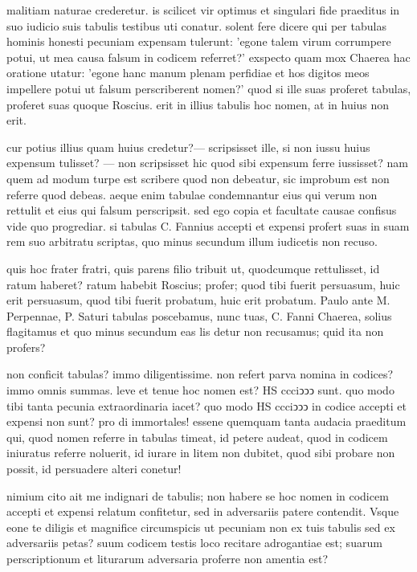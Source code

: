 
 malitiam naturae crederetur. is scilicet vir optimus et singulari fide praeditus in suo iudicio suis tabulis testibus uti conatur. solent fere dicere qui per tabulas hominis honesti pecuniam expensam tulerunt: 'egone talem virum corrumpere potui, ut mea causa falsum in codicem referret?' exspecto quam mox Chaerea hac oratione utatur: 'egone hanc manum plenam perfidiae et hos digitos meos impellere potui ut falsum perscriberent nomen?' quod si ille suas proferet tabulas, proferet suas quoque Roscius. erit in illius tabulis hoc nomen, at in huius non erit.

 cur potius illius quam huius credetur?— scripsisset ille, si non iussu huius expensum tulisset? — non scripsisset hic quod sibi expensum ferre iussisset? nam quem ad modum turpe est scribere quod non debeatur, sic improbum est non referre quod debeas. aeque enim tabulae condemnantur eius qui verum non rettulit et eius qui falsum perscripsit. sed ego copia et facultate causae confisus vide quo progrediar. si tabulas C. Fannius accepti et expensi profert suas in suam rem suo arbitratu scriptas, quo minus secundum illum iudicetis non recuso.

 quis hoc frater fratri, quis parens filio tribuit ut, quodcumque rettulisset, id ratum haberet? ratum habebit Roscius; profer; quod tibi fuerit persuasum, huic erit persuasum, quod tibi fuerit probatum, huic erit probatum. Paulo ante M. Perpennae, P. Saturi tabulas poscebamus, nunc tuas, C. Fanni Chaerea, solius flagitamus et quo minus secundum eas lis detur non recusamus; quid ita non profers?

 non conficit tabulas? immo diligentissime. non refert parva nomina in codices? immo omnis summas. leve et tenue hoc nomen est? HS ccciↄↄↄ sunt. quo modo tibi tanta pecunia extraordinaria iacet? quo modo HS ccciↄↄↄ in codice accepti et expensi non sunt? pro di immortales! essene quemquam tanta audacia praeditum qui, quod nomen referre in tabulas timeat, id petere audeat, quod in codicem iniuratus referre noluerit, id iurare in litem non dubitet, quod sibi probare non possit, id persuadere alteri conetur!

 nimium cito ait me indignari de tabulis; non habere se hoc nomen in codicem accepti et expensi relatum confitetur, sed in adversariis patere contendit. Vsque eone te diligis et magnifice circumspicis ut pecuniam non ex tuis tabulis sed ex adversariis petas? suum codicem testis loco recitare adrogantiae est; suarum perscriptionum et liturarum adversaria proferre non amentia est?

